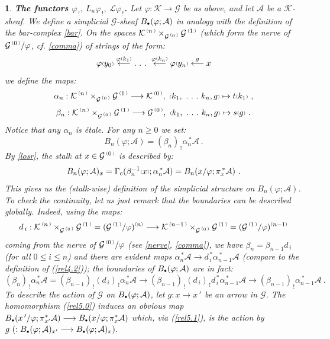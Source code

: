 \documentclass[a4paper]{article}
\newtheorem{num}[st]{}
\newcommand{\f}{\ensuremath{\varphi}}
\newcommand{\rmap}{\longrightarrow}
\newcommand{\lmap}{\longleftarrow}
\newcommand{\Ka}{\ensuremath{\mathcal{K}}}
\newcommand{\G}{\ensuremath{\mathcal{G}}}
\newcommand{\A}{\ensuremath{\mathcal{A}}}
\newcommand{\el}{\ensuremath{\mathcal{L}}}
\newcommand{\gc}{\ensuremath{\Gamma_c}}
\newcommand{\ps}{{\raise 1pt\hbox{\tiny (}}}
\newcommand{\pd}{{\raise 1pt\hbox{\tiny )}}}
\newcommand{\nG}[1]{\ensuremath{\G^{\,\ps #1\,\pd}}}
\newcommand{\nK}[1]{\ensuremath{\Ka^{\,\ps #1\,\pd}}}
\def\cdot{{\raise 0.5pt\hbox{$\scriptscriptstyle\bullet$}}}
\begin{document}
\begin{num}
\label{flosr}
\emph{
{\bf The functors $\f_{\, !},\ L_n\f_{\, !},\ \el\f_{\, !}$.} Let $\f: \Ka \rmap \G$ be as above, and let $\A$ be a  $\Ka$-sheaf. We define a simplicial $\G$-sheaf $B_{\cdot}(\f; \A )$ in analogy with the definition of the bar-complex \ref{bar}. On the spaces $\nK{n} \times_{\nG{0}} \nG{1}$ (which form the nerve of $\nG{0}/\f$, cf. \ref{comma}) of strings of the form:
\[ \f \ps y_{0}\pd \stackrel{\f \ps k_{1}\pd }{\longleftarrow} .\ .\ .\ \stackrel{\f \ps k_{n}\pd }{\longleftarrow} \f \ps y_{n}\pd \stackrel{g}{\lmap} x \]
we define the maps:
\[ \alpha_{n} : \nK{n} \times_{\nG{0}} \nG{1} \rmap \nK{0} , \ \ps k_{1},\ .\ .\ .\ k_{n}, g\pd \mapsto t\ps k_{1}\pd \ , \]
\[  \beta_{n} : \nK{n} \times_{\nG{0}} \nG{1} \rmap \nG{0} , \ \ps k_{1},\ .\ .\ .\ k_{n}, g\pd \mapsto s\ps g\pd \ . \] 
Notice that any $\alpha_n$ is \'etale. For any $n \geq 0$ we set:
\[ B_{n}(\f  ; \A ) = (\beta_{n})_{\, !}\alpha_{n}^{\, * } \A \ .\]
By \ref{losr}, the stalk at $x\in \nG{0}$ is described by:
\begin{equation}
\label{rel5.1} 
B_{n}(\f ; \A )_{x} = \gc (\beta_{n}^{-1} \ps x\pd ; \alpha_{n}^{\, *} \A ) = B_{n}( x/\f ; \pi_{x}^{\, *} \A )\ .
\end{equation}
This gives us the (stalk-wise) definition of the simplicial structure on $B_{n}(\f ; \A)$. To check the continuity, let us just remark that the boundaries can be described globally. Indeed, using the maps:
\[ d_{\, i}:  \nK{n} \times_{\nG{0}} \nG{1} = (\nG{1} /\f )^{\ps n\pd } \rmap \nK{n-1} \times_{\nG{0}} \nG{1} = (\nG{1} /\f )^{\ps n-1\pd }\]
coming from the nerve of $\nG{0} /\f $ (see \ref{nerve}, \ref{comma}), we have $\beta_{n} = \beta_{n-1} d_{\, i}$ (for all $0 \leq i \leq n$) and there are evident maps $\alpha_{n}^{\, *} \A \rmap d_{\, i}^{\, *} \alpha_{n-1}^{\, *} \A $ (compare to the definition of (\ref{rel4.2})); the boundaries of $B_{\cdot}(\f ; \A )$ are in fact: 
\[ (\beta_{n})_{\, !} \alpha_{n}^{\, *} \A = (\beta_{n-1})_{\, !} (d_{\, i})_{\, !} \alpha_{n}^{\, *} \A \rmap (\beta_{n-1})_{\, !} 
(d_{\, i})_{\, !} d_{\, i}^{\, *} \alpha_{n-1}^{\, *} \A \rmap (\beta_{n-1})_{\, !} \alpha_{n-1}^{\, *} \A  \ .\]
To describe the action of $\G$ on $B_{\cdot}(\f ; \A )$, let $g: x\rmap x\, ' $ be an arrow in $\G$. The homomorphism (\ref{rel5.0}) induces an obvious map $B_{\cdot}(x\, '/\f ; \pi_{x'}^{*}\A ) \rmap B_{\cdot}(x/\f ; \pi_{x}^{*}\A )$ which, via (\ref{rel5.1}), is the action by $g\ ( :B_{\cdot}(\f ; \A )_{x'} \rmap B_{\cdot}(\f ; \A )_{x}).$
}
\end{num}
\end{document}
